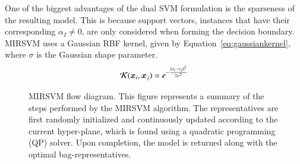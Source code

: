 \documentclass[preprint,12pt]{elsarticle}
\newcommand{\norm}[1]{{||#1||}}
\begin{document}
One of the biggest advantages of the dual SVM formulation is the sparseness of the resulting model. This is because support vectors, instances that have their corresponding $\alpha_I \neq 0$, are only considered when forming the decision boundary. MIRSVM uses a Gaussian RBF kernel, given by Equation~\eqref{eq:gaussiankernel}, where $\sigma$ is the Gaussian shape parameter.
\begin{equation}
\label{eq:gaussiankernel}
\centering
\mathcal{K}(\bm x_i, \bm x_j) = e^{-\frac{\norm{x_i - x_j}^2}{2\sigma^2}}
\end{equation}
\begin{figure}[tpb!]
\centering
\small
\label{fig:mirsvm}
\begin{minipage}{\textwidth}
\caption{MIRSVM flow diagram. This figure represents a summary of the steps performed by the MIRSVM algorithm. The representatives are first randomly initialized and continuously updated according to the current hyper-plane, which is found using a quadratic programming (QP) solver. Upon completion, the model is returned along with the optimal bag-representatives.}
\end{minipage}


\end{figure}
\end{document}
